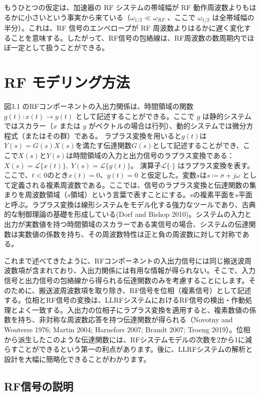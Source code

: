 \documentclass[book]{jlreq}
\begin{document}
もうひとつの仮定は、加速器の RF システムの帯域幅が RF 動作周波数よりもはるかに小さいという事実から来ている（$\omega_{1/2} \ll \omega_{RF}$ 、ここで $\omega_{1/2}$ は全帯域幅の半分）。これは、RF 信号のエンベロープが RF 周波数よりはるかに遅く変化することを意味する。したがって、RF信号の包絡線は、RF周波数の数周期内でほぼ一定として扱うことができる。

\section{RF モデリング方法}

図3.1 のRFコンポーネントの入出力関係は、時間領域の関数 $g(t) : x(t) \rightarrow y(t)$ として記述することができる。ここで $g$ は静的システムではスカラー（$x$ または $y$ がベクトルの場合は行列）、動的システムでは微分方程式（またはその群）である。
ラプラス変換を用いると$g(t)$は$Y(s) = G(s)X(s)$を満たす伝達関数$G(s)$として記述することができ、ここで$X(s)$と$Y(s)$は時間領域の入力と出力信号のラプラス変換である：$X(s) = \mathcal{L}\{x(t)\},\; Y(s) = \mathcal{L}\{y(t)\}$。
演算子$\mathcal{L}\{\cdot\}$ はラプラス変換を表す。ここで、$t<0$のとき$x(t) = 0$、$y(t) = 0$ と仮定した。変数$s$は$s \coloneqq \sigma + j\omega$ として定義される複素周波数である。ここでは、信号のラプラス変換と伝達関数の集まりを周波数領域（$s$領域）という言葉で表すことにする。$s$の複素平面を$s$平面と呼ぶ。ラプラス変換は線形システムをモデル化する強力なツールであり、古典的な制御理論の基礎を形成している(Dorf and Bishop 2010)。システムの入力と出力が実数値を持つ時間領域のスカラーである実信号の場合、システムの伝達関数は実数値の係数を持ち、その周波数特性は正と負の周波数に対して対称である。

これまで述べてきたように、RFコンポーネントの入出力信号には同じ搬送波周波数項が含まれており、入出力関係には有用な情報が得られない。そこで、入力信号と出力信号の包絡線から得られる伝達関数のみを考慮することにします。そのために、搬送波周波数項を取り除き、RF信号を位相（複素信号）として記述する。位相とRF信号の変換は、LLRFシステムにおけるRF信号の検出・作動処理とよく一致する。入出力の位相子にラプラス変換を適用すると、複素数値の係数を持ち、非対称な周波数応答を持つ伝達関数が得られる（Novotny and Wouterse 1976; Martin 2004; Harnefors 2007; Brandt 2007; Troeng 2019）。位相から派生したこのような伝達関数には、RFシステムモデルの次数を2から1に減らすことができるという第一の利点があります。後に、LLRFシステムの解析と設計を大幅に簡略化できることがわかります。

\subsection{RF信号の説明}
\end{document}
